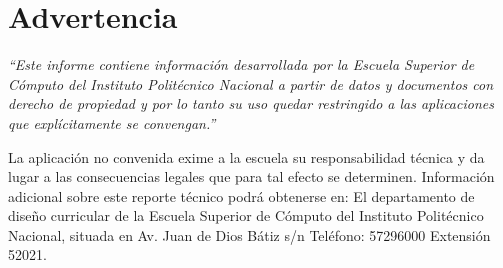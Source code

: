 
\chapter*{Advertencia}

\emph{``Este informe contiene información desarrollada por la Escuela Superior de Cómputo del Instituto Politécnico Nacional a partir de datos y documentos con derecho de propiedad y por lo tanto su uso quedar restringido a las aplicaciones que explícitamente se convengan.''}

\vspace{0.5 cm}

La aplicación no convenida exime a la escuela su responsabilidad técnica y da lugar a las consecuencias legales que para tal efecto se determinen. Información adicional sobre este reporte técnico podrá obtenerse en: El departamento de diseño curricular de la Escuela Superior de Cómputo del Instituto Politécnico Nacional, situada en Av. Juan de Dios Bátiz s/n Teléfono: 57296000 Extensión 52021.


